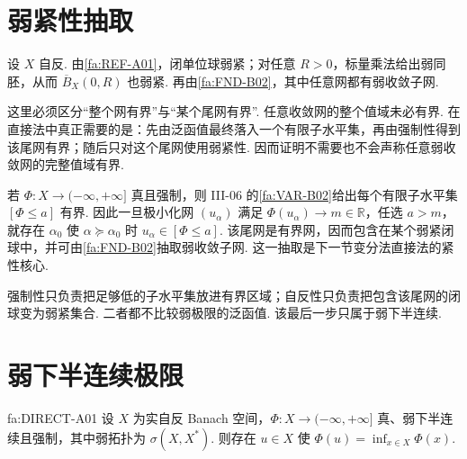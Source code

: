 \section{弱紧性抽取}\label{sec:iii07-weak-compactness}

设 \(\displaystyle X\) 自反. 由\autoref{fa:REF-A01}，闭单位球弱紧；对任意 \(\displaystyle R>0\)，标量乘法给出弱同胚，从而 \(\displaystyle\overline B_X(0,R)\) 也弱紧. 再由\autoref{fa:FND-B02}，其中任意网都有弱收敛子网.

这里必须区分“整个网有界”与“某个尾网有界”. 任意收敛网的整个值域未必有界. 在直接法中真正需要的是：先由泛函值最终落入一个有限子水平集，再由强制性得到该尾网有界；随后只对这个尾网使用弱紧性. 因而证明不需要也不会声称任意弱收敛网的完整值域有界.

若 \(\displaystyle\Phi:X\to(-\infty,+\infty]\) 真且强制，则 III-06 的\autoref{fa:VAR-B02}给出每个有限子水平集 \(\displaystyle[\Phi\leqslant a]\) 有界. 因此一旦极小化网 \(\displaystyle(u_\alpha)\) 满足 \(\displaystyle\Phi(u_\alpha)\to m\in\mathbb R\)，任选 \(\displaystyle a>m\)，就存在 \(\displaystyle\alpha_0\) 使 \(\displaystyle\alpha\succeq\alpha_0\) 时
\(\displaystyle u_\alpha\in[\Phi\leqslant a]\).
该尾网是有界网，因而包含在某个弱紧闭球中，并可由\autoref{fa:FND-B02}抽取弱收敛子网. 这一抽取是下一节变分法直接法的紧性核心.

\begin{FARemark}
强制性只负责把足够低的子水平集放进有界区域；自反性只负责把包含该尾网的闭球变为弱紧集合. 二者都不比较弱极限的泛函值. 该最后一步只属于弱下半连续.
\end{FARemark}

\section{弱下半连续极限}\label{sec:iii07-wlsc-limit}

\begin{FATheorem}[A][变分法直接法]{fa:DIRECT-A01}
设 \(\displaystyle X\) 为实自反 Banach 空间，\(\displaystyle\Phi:X\to(-\infty,+\infty]\) 真、弱下半连续且强制，其中弱拓扑为 \(\displaystyle\sigma(X,X^*)\). 则存在 \(\displaystyle u\in X\) 使
\(\displaystyle \Phi(u) = \inf_{x\in X}\Phi(x)\).
\end{FATheorem}

